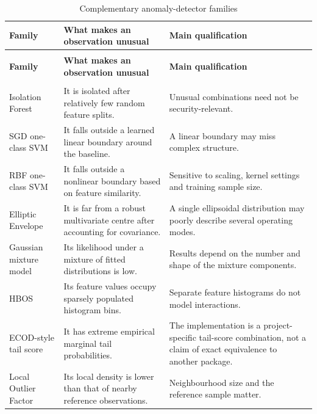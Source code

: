 \documentclass[11pt,a4paper]{article}
\begin{document}
\begingroup
\small
\begin{longtable}{>{\RaggedRight\arraybackslash}p{}>{\RaggedRight\arraybackslash}p{}>{\RaggedRight\arraybackslash}p{}}
\caption{Complementary anomaly-detector families}\label{tab:2}\\
\toprule
\rowcolor{pale} \textbf{Family} & \textbf{What makes an observation unusual} & \textbf{Main qualification} \\
\midrule
\endfirsthead
\multicolumn{3}{l}{\small\itshape Table \thetable{} --- continued}\\
\toprule
\rowcolor{pale} \textbf{Family} & \textbf{What makes an observation unusual} & \textbf{Main qualification} \\
\midrule
\endhead
\midrule
\multicolumn{3}{r}{\footnotesize Continued on the next page}\\
\endfoot
\bottomrule
\endlastfoot
Isolation Forest & It is isolated after relatively few random feature splits. & Unusual combinations need not be security-relevant. \\[3pt]
SGD one-class SVM & It falls outside a learned linear boundary around the baseline. & A linear boundary may miss complex structure. \\[3pt]
RBF one-class SVM & It falls outside a nonlinear boundary based on feature similarity. & Sensitive to scaling, kernel settings and training sample size. \\[3pt]
Elliptic Envelope & It is far from a robust multivariate centre after accounting for covariance. & A single ellipsoidal distribution may poorly describe several operating modes. \\[3pt]
Gaussian mixture model & Its likelihood under a mixture of fitted distributions is low. & Results depend on the number and shape of the mixture components. \\[3pt]
HBOS & Its feature values occupy sparsely populated histogram bins. & Separate feature histograms do not model interactions. \\[3pt]
ECOD-style tail score & It has extreme empirical marginal tail probabilities. & The implementation is a project-specific tail-score combination, not a claim of exact equivalence to another package. \\[3pt]
Local Outlier Factor & Its local density is lower than that of nearby reference observations. & Neighbourhood size and the reference sample matter. \\[3pt]

\end{longtable}
\end{document}
